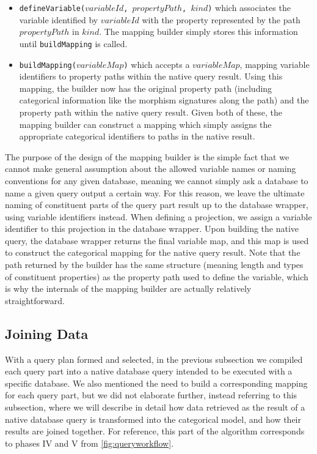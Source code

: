 \begin{itemize}
    \item \texttt{defineVariable($variableId$, $propertyPath$, $kind$)} which associates the variable identified by $variableId$ with the property represented by the path $propertyPath$ in $kind$. The mapping builder simply stores this information until \texttt{buildMapping} is called.
    \item \texttt{buildMapping($variableMap$)} which accepts a $variableMap$, mapping variable identifiers to property paths within the native query result. Using this mapping, the builder now has the original property path (including categorical information like the morphism signatures along the path) and the property path within the native query result. Given both of these, the mapping builder can construct a mapping which simply assigns the appropriate categorical identifiers to paths in the native result.
\end{itemize}

The purpose of the design of the mapping builder is the simple fact that we cannot make general assumption about the allowed variable names or naming conventions for any given database, meaning we cannot simply ask a database to name a given query output a certain way.
For this reason, we leave the ultimate naming of constituent parts of the query part result up to the database wrapper, using variable identifiers instead.
When defining a projection, we assign a variable identifier to this projection in the database wrapper.
Upon building the native query, the database wrapper returns the final variable map, and this map is used to construct the categorical mapping for the native query result.
Note that the path returned by the builder has the same structure (meaning length and types of constituent properties) as the property path used to define the variable, which is why the internals of the mapping builder are actually relatively straightforward.

\subsection{Joining Data}
\label{algo:subsection:joiningdata}

With a query plan formed and selected, in the previous subsection we compiled each query part into a native database query intended to be executed with a specific database.
We also mentioned the need to build a corresponding mapping for each query part, but we did not elaborate further, instead referring to this subsection, where we will describe in detail how data retrieved as the result of a native database query is transformed into the categorical model, and how their results are joined together.
For reference, this part of the algorithm corresponds to phases IV and V from \cref{fig:queryworkflow}.

